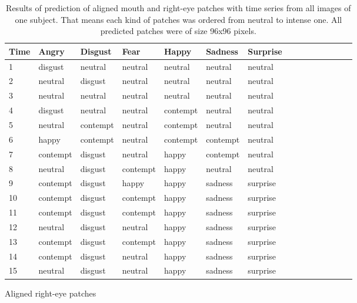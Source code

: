 \begin{table}
    \begin{subtable}{4.7in}
    \begin{tabular}{|*{15}{p{1.34cm}<{\centering}|}|}
    \hline
    Time & Angry &  Disgust  & Fear & Happy & Sadness & Surprise  \\
    \hline
    1 & disgust & neutral & neutral & neutral & neutral & neutral \\
    2 & neutral & disgust & neutral & neutral & neutral & neutral \\
    3 & neutral & neutral & neutral & neutral & neutral & neutral \\
    4 & disgust & neutral & neutral & contempt & neutral & neutral \\
    5 & neutral & contempt & neutral & contempt & neutral & neutral	\\
    6 & happy & contempt & neutral & contempt & contempt & neutral \\
    7 & contempt & disgust & neutral & happy & contempt & neutral \\
    8 & neutral & disgust & contempt & happy & neutral & neutral \\
    9 & contempt & disgust & happy & happy & sadness & surprise \\
    10 & contempt & disgust & contempt & happy & sadness & surprise	\\
    11 & contempt & disgust & contempt & happy & sadness & surprise \\
    12 & neutral & disgust & neutral & happy & sadness & surprise \\
    13 & contempt & disgust & contempt & happy & sadness & surprise \\
    14 & contempt & disgust & neutral & happy & sadness & surprise \\
    15 & neutral & disgust & neutral & happy & sadness & surprise\\

    \hline
    \end{tabular}
    \caption{Aligned right-eye patches}
    \label{table:predict_series:righteye}
    \end{subtable}

\caption[Results of prediction of aligned patches]{Results of prediction of aligned mouth and right-eye patches with time series from all images of one subject. That means each kind of patches was ordered from neutral to intense one. All predicted patches were of size 96x96 pixels. }
\label{table:predict_series}
\end{table}


